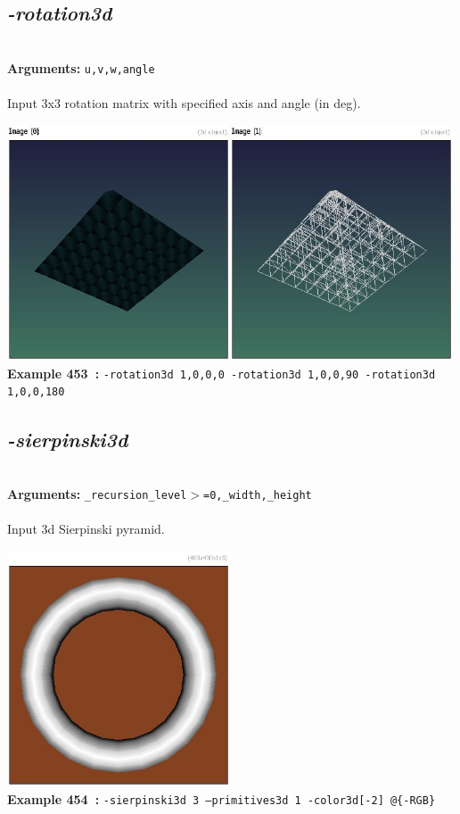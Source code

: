 \documentclass[a4paper,11pt,twoside]{book}
\begin{document}
\subsection{\emph{-rotation3d} }\vspace*{-0.5em}
~\\\textbf{Arguments: } 
{\small \texttt{u,v,w,angle}}\\~\\
Input 3x3 rotation matrix with specified axis and angle (in deg).
\begin{center}\includegraphics[keepaspectratio=true,height=7cm,width=\textwidth]{img/gmic_def453.jpg}\\
{\footnotesize \textbf{Example 453~:} \texttt{-rotation3d 1,0,0,0 -rotation3d 1,0,0,90 -rotation3d 1,0,0,180}}
\end{center}

\subsection{\emph{-sierpinski3d} }\vspace*{-0.5em}
~\\\textbf{Arguments: } 
{\small \texttt{\_recursion\_level$>$=0,\_width,\_height}}\\~\\
Input 3d Sierpinski pyramid.
\begin{center}\includegraphics[keepaspectratio=true,height=7cm,width=\textwidth]{img/gmic_def454.jpg}\\
{\footnotesize \textbf{Example 454~:} \texttt{-sierpinski3d 3 --primitives3d 1 -color3d[-2] @\{-RGB\}}}
\end{center}
\end{document}
